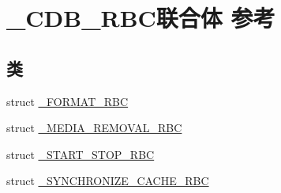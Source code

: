 \hypertarget{union___c_d_b___r_b_c}{}\section{\+\_\+\+C\+D\+B\+\_\+\+R\+B\+C联合体 参考}
\label{union___c_d_b___r_b_c}
\subsection*{类}
\begin{DoxyCompactItemize}
\item 
struct \hyperlink{struct___c_d_b___r_b_c_1_1___f_o_r_m_a_t___r_b_c}{\+\_\+\+F\+O\+R\+M\+A\+T\+\_\+\+R\+BC}
\item 
struct \hyperlink{struct___c_d_b___r_b_c_1_1___m_e_d_i_a___r_e_m_o_v_a_l___r_b_c}{\+\_\+\+M\+E\+D\+I\+A\+\_\+\+R\+E\+M\+O\+V\+A\+L\+\_\+\+R\+BC}
\item 
struct \hyperlink{struct___c_d_b___r_b_c_1_1___s_t_a_r_t___s_t_o_p___r_b_c}{\+\_\+\+S\+T\+A\+R\+T\+\_\+\+S\+T\+O\+P\+\_\+\+R\+BC}
\item 
struct \hyperlink{struct___c_d_b___r_b_c_1_1___s_y_n_c_h_r_o_n_i_z_e___c_a_c_h_e___r_b_c}{\+\_\+\+S\+Y\+N\+C\+H\+R\+O\+N\+I\+Z\+E\+\_\+\+C\+A\+C\+H\+E\+\_\+\+R\+BC}
\end{DoxyCompactItemize}
